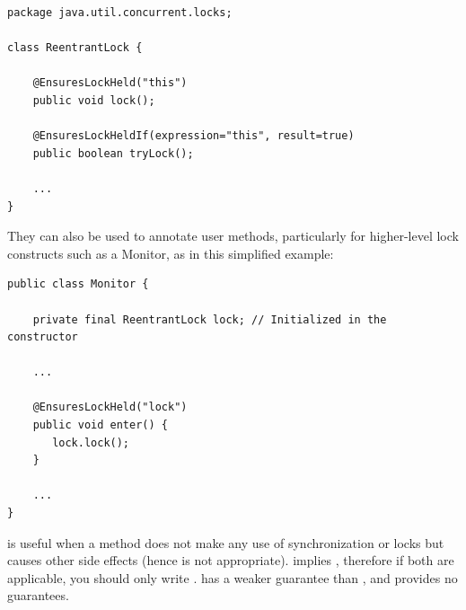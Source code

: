 \begin{Verbatim}
package java.util.concurrent.locks;

class ReentrantLock {

    @EnsuresLockHeld("this")
    public void lock();

    @EnsuresLockHeldIf(expression="this", result=true)
    public boolean tryLock();

    ...
}
\end{Verbatim}

They can also be used to annotate user methods, particularly for
higher-level lock constructs such as a Monitor, as in this simplified example:

\begin{Verbatim}
public class Monitor {

    private final ReentrantLock lock; // Initialized in the constructor

    ...

    @EnsuresLockHeld("lock")
    public void enter() {
       lock.lock();
    }

    ...
}
\end{Verbatim}


 is useful when a method does not make any use of synchronization
or locks but causes other side effects (hence  is not appropriate).
 implies , therefore if both are applicable,
you should only write .  has a weaker guarantee
than , and  provides no guarantees.


